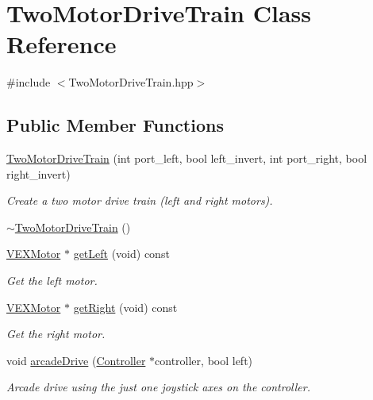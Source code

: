 \hypertarget{class_two_motor_drive_train}{}\section{Two\+Motor\+Drive\+Train Class Reference}
\label{class_two_motor_drive_train}


{\ttfamily \#include $<$Two\+Motor\+Drive\+Train.\+hpp$>$}

\subsection*{Public Member Functions}
\begin{DoxyCompactItemize}
\item 
\hyperlink{class_two_motor_drive_train_a9ae44c21661482476a71f4a2e9ea0c97}{Two\+Motor\+Drive\+Train} (int port\+\_\+left, bool left\+\_\+invert, int port\+\_\+right, bool right\+\_\+invert)
\begin{DoxyCompactList}\small\item\em Create a two motor drive train (left and right motors). \end{DoxyCompactList}\item 
\hyperlink{class_two_motor_drive_train_adc187042a28ad463e50e47f04e386db1}{$\sim$\+Two\+Motor\+Drive\+Train} ()
\item 
\hyperlink{class_v_e_x_motor}{V\+E\+X\+Motor} $\ast$ \hyperlink{class_two_motor_drive_train_a416c665218391af6cf398a9a195ec23b}{get\+Left} (void) const
\begin{DoxyCompactList}\small\item\em Get the left motor. \end{DoxyCompactList}\item 
\hyperlink{class_v_e_x_motor}{V\+E\+X\+Motor} $\ast$ \hyperlink{class_two_motor_drive_train_a327a9691e057a60f06a9740cd4ef8c4c}{get\+Right} (void) const
\begin{DoxyCompactList}\small\item\em Get the right motor. \end{DoxyCompactList}\item 
void \hyperlink{class_two_motor_drive_train_a1ae95f1e06274435304783c9a4ec7820}{arcade\+Drive} (\hyperlink{class_controller}{Controller} $\ast$controller, bool left)
\begin{DoxyCompactList}\small\item\em Arcade drive using the just one joystick axes on the controller. \end{DoxyCompactList}\item 

\end{DoxyCompactItemize}
